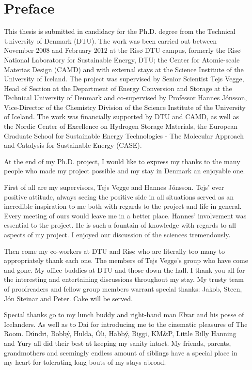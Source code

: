 \section*{Preface}

This thesis is submitted in candidacy for the Ph.D. degree from the Technical University of Denmark (DTU).
The work was been carried out between November 2008 and February 2012 at the Ris\o{} DTU campus, formerly the Ris\o{} National Laboratory for Sustainable Energy, DTU; the Center for Atomic-scale Materias Design (CAMD) and with external stays at the Science Institute of the University of Iceland.
The project was supervised by Senior Scientist Tejs Vegge, Head of Section at the Department of Energy Conversion and Storage at the Technical University of Denmark and co-supervised by Professor Hannes J\'onsson, Vice-Director of the Chemistry Division of the Science Institute of the University of Iceland.
The work was financially supported by DTU and CAMD, as well as the Nordic Center of Excellence on Hydrogen Storage Materials, the European Graduate School for Sustainable Energy Technologies - The Molecular Approach and Catalysis for Sustainable Energy (CASE).

\vspace{1em}

At the end of my Ph.D. project, I would like to express my thanks to the many people who made my project possible and my stay in Denmark an enjoyable one.

First of all are my supervisors, Tejs Vegge and Hannes J\'onsson.
Tejs' ever positive attitude, always seeing the positive side in all situations served as an incredible inspiration to me both with regards to the project and life in general.
Every meeting of ours would leave me in a better place.
Hannes' involvement was essential to the project.
He is such a fountain of knowledge with regards to all aspects of my project.
I enjoyed our discussion of the sciences tremendously.

Then come my co-workers at DTU and Ris\o{} who are literally too many to appropriately thank each one.
The members of Tejs Vegge's group who have come and gone.
My office buddies at DTU and those down the hall.
I thank you all for the interesting and entertaining discussions throughout my stay.
My trusty team of proofreaders and fellow group members warrant special thanks: Jakob, Steen, J\'on Steinar and Peter.
Cake will be served.

Special thanks go to my lunch buddy and right-hand man Elvar and his posse of Icelanders.
As well as to Da\dh{}i for introducing me to the cinematic pleasures of The Room.
D\'undri, Bobb\'y, Hulda, \'Oli, Habb\'y, Biggi, KM\&P, Little Billy Hanning and  Yury all did their best at keeping my sanity intact.
My friends, parents, grandmothers and seemingly endless amount of siblings have a special place in my heart for tolerating long bouts of my stays abroad.

